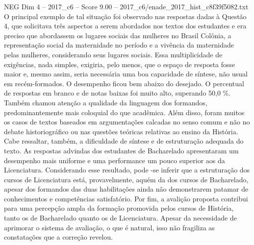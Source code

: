 \begin{textsample}{NEG Dim 4 – 2017\_c6 – Score 9.00 – 2017\_c6/enade\_2017\_hist\_c8f39f5082.txt}
O principal exemplo de tal situação foi observado nas respostas dadas à Questão 4, que solicitava três aspectos a serem abordados nos textos dos estudantes e era preciso que abordassem os lugares sociais das mulheres no Brasil Colônia, a representação social da maternidade no período e a vivência da maternidade pelas mulheres, considerando seus lugares sociais.
Essa multiplicidade de exigências, nada simples, exigiria, pelo menos, que o espaço de resposta fosse maior e, mesmo assim, seria necessária uma boa capacidade de síntese, não usual em recém-formados.
O desempenho ficou bem abaixo do desejado.
O percentual de respostas em branco e de notas baixas foi muito alto, superando 50,0 \%.
Também chamou atenção a qualidade da linguagem dos formandos, predominantemente mais coloquial do que acadêmica.
Além disso, foram muitos os casos de textos baseados em argumentações calcadas no senso comum e não no debate historiográfico ou nas questões teóricas relativas ao ensino da História.
Cabe ressaltar, também, a dificuldade de síntese e de estruturação adequada do texto.
As respostas advindas dos estudantes de Bacharelado apresentaram um desempenho mais uniforme e uma performance um pouco superior aos da Licenciatura.
Considerando esse resultado, pode -se inferir que a estruturação dos cursos de Licenciatura está, provavelmente, aquém da dos cursos de Bacharelado, apesar dos formandos das duas habilitações ainda não demonstrarem patamar de conhecimentos e competências satisfatório.
Por fim, a avalição proposta contribui para uma percepção ampla da formação promovida pelos cursos de História, tanto os de Bacharelado quanto os de Licenciatura.
Apesar da necessidade de aprimorar o sistema de avaliação, o que é natural, isso não fragiliza as constatações que a correção revelou.

\end{textsample}
